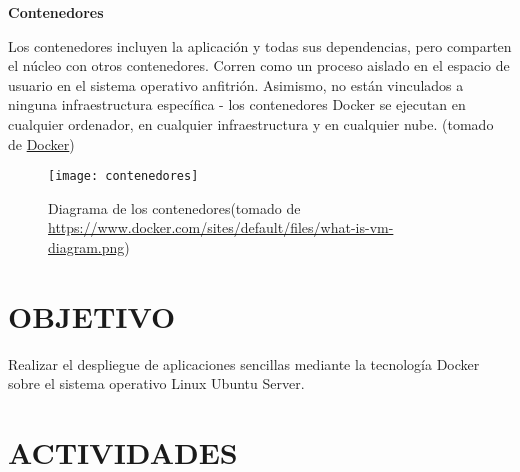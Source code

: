 \documentclass[10pt]{article}   			%
\begin{document}
\textbf{Contenedores}

Los contenedores incluyen la aplicación y todas sus dependencias, pero comparten el núcleo con otros contenedores. Corren como un proceso aislado en el espacio de usuario en el sistema operativo anfitrión. Asimismo, no están vinculados a ninguna infraestructura específica - los contenedores Docker se ejecutan en cualquier ordenador, en cualquier infraestructura y en cualquier nube.	(tomado de \href{https://www.docker.com/what-docker}{Docker})
\newpage
	\begin{figure}[ht]
		\centering
		\texttt{[image: contenedores]}   
		\caption{Diagrama de los contenedores(tomado de \href{https://www.docker.com/sites/default/files/what-is-vm-diagram.png}{https://www.docker.com/sites/default/files/what-is-vm-diagram.png})} 
	\end{figure}
	

	
\section{OBJETIVO}
Realizar el despliegue de aplicaciones sencillas mediante la tecnología Docker sobre el sistema operativo Linux Ubuntu Server.
\section{ACTIVIDADES}	
\end{document}
